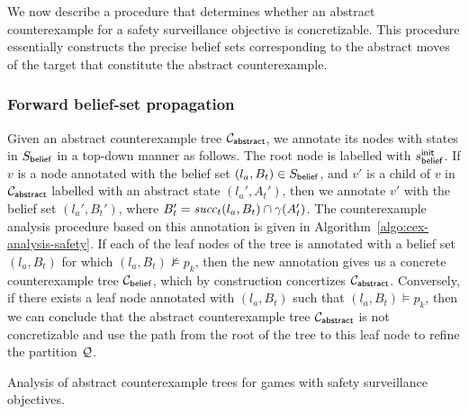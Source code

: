 We now describe a procedure that determines whether an abstract counterexample for a safety surveillance objective is concretizable. This procedure essentially constructs the precise belief sets corresponding to the abstract moves of the target that constitute the abstract counterexample.

\subsubsection{Forward belief-set propagation}
Given an abstract counterexample tree $\mathcal{C}_{\mathsf{abstract}}$, we annotate its nodes with states in $S_{\mathsf{belief}}$ in a top-down manner as follows. 
The root node is labelled with $s_{\mathsf{belief}}^{\mathsf{init}}$. 
If $v$ is a node annotated with the belief set $(l_a,B_t) \in S_{\mathsf{belief}}$, and  $v'$ is a child of $v$ in $\mathcal{C}_{\mathsf{abstract}}$ labelled with an abstract state $(l_a',A_t')$, then we annotate $v'$ with the belief set $(l_a',B_t')$, where 
$B_t' = \mathit{succ}_t(l_a,B_t) \cap \gamma(A_t')$. The counterexample analysis procedure based on this annotation is given in Algorithm~\ref{algo:cex-analysis-safety}.
If each of the leaf nodes of the tree is annotated with a belief set $(l_a,B_t)$ for which $(l_a,B_t) \not\models p_k$, then the new annotation gives us a concrete counterexample tree $\mathcal{C}_{\mathsf{belief}}$, which by construction concertizes $\mathcal{C}_{\mathsf{abstract}}$. Conversely, if there exists a leaf node annotated with $(l_a,B_t)$ such that $(l_a,B_t) \models p_k$, then we can conclude that the abstract counterexample tree $\mathcal{C}_{\mathsf{abstract}}$ is not concretizable and use the path from the root of the tree to this leaf node to refine the partition $\mathcal{Q}$.
\begin{algorithm}[h]
\small
{}

\smallskip

%
{\KwRet{$\pi$;}}
{}

\smallskip


\caption{Analysis of abstract counterexample trees for games with safety surveillance objectives.}
\label{algo:cex-analysis-safety}
\end{algorithm}

